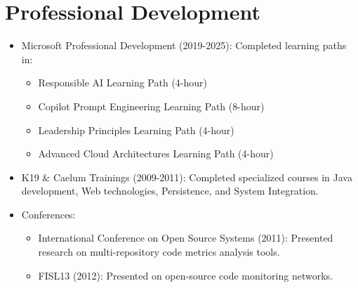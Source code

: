 
\section{Professional Development}
\begin{itemize}
    \item \small{Microsoft Professional Development (2019-2025):}
    \footnotesize{Completed learning paths in:}
    \begin{itemize}[itemsep=1pt, parsep=0pt]
        \item \footnotesize{Responsible AI Learning Path (4-hour)}%
        \item \footnotesize{Copilot Prompt Engineering Learning Path (8-hour)}%
        \item \footnotesize{Leadership Principles Learning Path (4-hour)}%
        \item \footnotesize{Advanced Cloud Architectures Learning Path (4-hour)}%
    \end{itemize}
    \item \footnotesize{K19 \& Caelum Trainings (2009-2011):}\scriptsize{ Completed specialized courses in Java development, Web technologies, Persistence, and System Integration.}
    \item \small{Conferences:}
    \begin{itemize}[itemsep=1pt, parsep=0pt]
        \item \footnotesize{International Conference on Open Source Systems (2011): Presented research on multi-repository code metrics analysis tools.}
        \item \footnotesize{FISL13 (2012): Presented on open-source code monitoring networks.}
    \end{itemize}
\end{itemize}